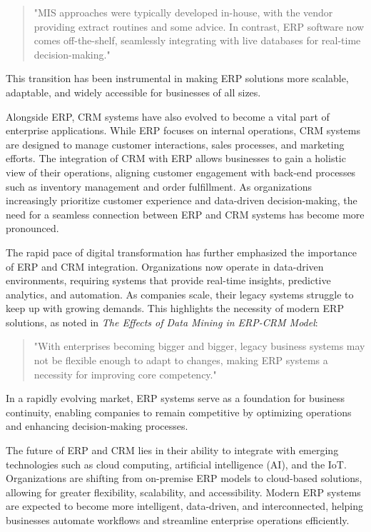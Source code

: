 \begin{quote}
"MIS approaches were typically developed in-house, with the vendor providing extract routines and some advice. In contrast, ERP software now comes off-the-shelf, seamlessly integrating with live databases for real-time decision-making." \cite{crc_erp_integration}
\end{quote}

This transition has been instrumental in making ERP solutions more scalable, adaptable, and widely accessible for businesses of all sizes.  

Alongside ERP, CRM systems have also evolved to become a vital part of enterprise applications. While ERP focuses on internal operations, CRM systems are designed to manage customer interactions, sales processes, and marketing efforts. The integration of CRM with ERP allows businesses to gain a holistic view of their operations, aligning customer engagement with back-end processes such as inventory management and order fulfillment. As organizations increasingly prioritize customer experience and data-driven decision-making, the need for a seamless connection between ERP and CRM systems has become more pronounced.  

The rapid pace of digital transformation has further emphasized the importance of ERP and CRM integration. Organizations now operate in data-driven environments, requiring systems that provide real-time insights, predictive analytics, and automation. As companies scale, their legacy systems struggle to keep up with growing demands. This highlights the necessity of modern ERP solutions, as noted in \textit{The Effects of Data Mining in ERP-CRM Model}:

\begin{quote}
"With enterprises becoming bigger and bigger, legacy business systems may not be flexible enough to adapt to changes, making ERP systems a necessity for improving core competency." \cite{effects_data_mining}
\end{quote}

In a rapidly evolving market, ERP systems serve as a foundation for business continuity, enabling companies to remain competitive by optimizing operations and enhancing decision-making processes.  

The future of ERP and CRM lies in their ability to integrate with emerging technologies such as cloud computing, artificial intelligence (AI), and the IoT. Organizations are shifting from on-premise ERP models to cloud-based solutions, allowing for greater flexibility, scalability, and accessibility. Modern ERP systems are expected to become more intelligent, data-driven, and interconnected, helping businesses automate workflows and streamline enterprise operations efficiently.  


